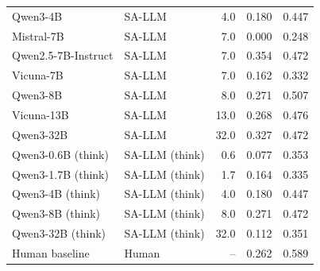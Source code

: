 \begin{table}[t]
\begin{tabular}{llrrr}
Qwen3-4B & SA-LLM & 4.0 & 0.180 & 0.447 \\
Mistral-7B & SA-LLM & 7.0 & 0.000 & 0.248 \\
Qwen2.5-7B-Instruct & SA-LLM & 7.0 & 0.354 & 0.472 \\
Vicuna-7B & SA-LLM & 7.0 & 0.162 & 0.332 \\
Qwen3-8B & SA-LLM & 8.0 & 0.271 & 0.507 \\
Vicuna-13B & SA-LLM & 13.0 & 0.268 & 0.476 \\
Qwen3-32B & SA-LLM & 32.0 & 0.327 & 0.472 \\
Qwen3-0.6B (think) & SA-LLM (think) & 0.6 & 0.077 & 0.353 \\
Qwen3-1.7B (think) & SA-LLM (think) & 1.7 & 0.164 & 0.335 \\
Qwen3-4B (think) & SA-LLM (think) & 4.0 & 0.180 & 0.447 \\
Qwen3-8B (think) & SA-LLM (think) & 8.0 & 0.271 & 0.472 \\
Qwen3-32B (think) & SA-LLM (think) & 32.0 & 0.112 & 0.351 \\
\midrule
Human baseline & Human & -- & 0.262 & 0.589 \\
\bottomrule
\end{tabular}
\end{table}
